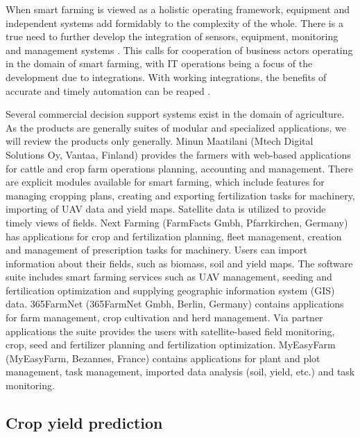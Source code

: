 When smart farming is viewed as a holistic operating framework, equipment and independent systems add formidably to the complexity of the whole. There is a true need to further develop the integration of sensors, equipment, monitoring and management systems \cite{Sundmaeker2016}. This calls for cooperation of business actors operating in the domain of smart farming, with IT operations being a focus of the development due to integrations. With working integrations, the benefits of accurate and timely automation can be reaped \cite{Zamora-Izquierdo2019}.

Several commercial decision support systems exist in the domain of agriculture. As the products are generally suites of modular and specialized applications, we will review the products only generally. Minun Maatilani (Mtech Digital Solutions Oy, Vantaa, Finland) provides the farmers with web-based applications for cattle and crop farm operations planning, accounting and management. There are explicit modules available for smart farming, which include features for managing cropping plans, creating and exporting fertilization tasks for machinery, importing of UAV data and yield maps. Satellite data is utilized to provide timely views of fields. Next Farming (FarmFacts Gmbh, Pfarrkirchen, Germany) has applications for crop and fertilization planning, fleet management, creation and management of prescription tasks for machinery. Users can import information about their fields, such as biomass, soil and yield maps. The software suite includes smart farming services such as UAV management, seeding and fertilication optimization and supplying geographic information system (GIS) data. 365FarmNet (365FarmNet Gmbh, Berlin, Germany) contains applications for farm management, crop cultivation and herd management. Via partner applications the suite provides the users with satellite-based field monitoring, crop, seed and fertilizer planning and fertilization optimization. MyEasyFarm (MyEasyFarm, Bezannes, France) contains applications for plant and plot management, task management, imported data analysis (soil, yield, etc.) and task monitoring.


\subsection{Crop yield prediction}
\label{subsec:crop-yield-prediction-review}

